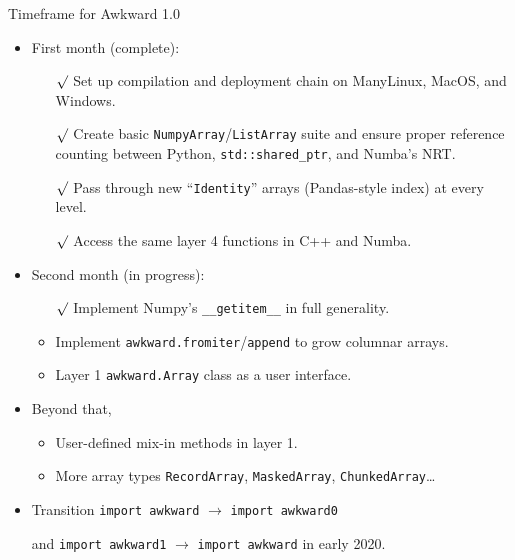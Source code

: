 \documentclass[aspectratio=169]{beamer}
\begin{document}
\begin{frame}{Timeframe for Awkward 1.0}
\large
\vspace{0.25 cm}
\begin{itemize}\setlength{\itemsep}{0.25 cm}
\item First month (complete):
\begin{itemize}\setlength{\itemsep}{0.1 cm}
\item[\textcolor{darkblue}{$\surd$}] Set up compilation and deployment chain on ManyLinux, MacOS, and Windows.
\item[\textcolor{darkblue}{$\surd$}] Create basic \texttt{NumpyArray}/\texttt{ListArray} suite and ensure proper reference counting between Python, \texttt{std::shared_ptr}, and Numba's NRT.
\item[\textcolor{darkblue}{$\surd$}] Pass through new ``\texttt{Identity}'' arrays (Pandas-style index) at every level.
\item[\textcolor{darkblue}{$\surd$}] Access the same layer 4 functions in C++ and Numba.
\end{itemize}

\item Second month (in progress):
\begin{itemize}
\item[\textcolor{darkblue}{$\surd$}] Implement Numpy's \texttt{__getitem__} in full generality.
\item Implement \texttt{awkward.fromiter}/\texttt{append} to grow columnar arrays.
\item Layer 1 \texttt{awkward.Array} class as a user interface.
\end{itemize}

\item Beyond that,
\begin{itemize}
\item User-defined mix-in methods in layer 1.
\item More array types \texttt{RecordArray}, \texttt{MaskedArray}, \texttt{ChunkedArray}\ldots
\end{itemize}

\item Transition {\normalsize \texttt{import awkward}} $\to$ {\normalsize \texttt{import awkward0}}

\hspace{1.1 cm}and {\normalsize \texttt{import awkward1}} $\to$ {\normalsize \texttt{import awkward}} in early 2020.
\end{itemize}
\end{frame}
\end{document}
